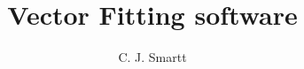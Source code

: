\documentclass{article}
\begin{document}
\title{Vector Fitting software}
\author{C. J. Smartt}

\maketitle




\clearpage



\clearpage



\clearpage



\clearpage



\clearpage
\end{document}
